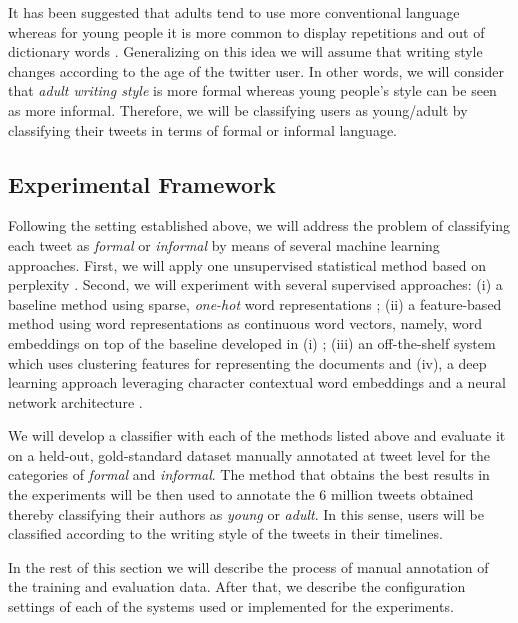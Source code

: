 \documentclass[information,article,submit,moreauthors,pdftex,10pt,a4paper]{Definitions/mdpi}
\begin{document}
It has been suggested that adults tend to use more conventional language \cite{nguyen2013old} whereas for young people it is more common to display repetitions and out of dictionary words \citep{rao2010classifying,rosenthal2011age,morgan2017predicting}. Generalizing on this idea we will assume that writing style changes according to the age of the twitter user. In other words, we will consider that \emph{adult writing style} is more formal whereas young people's style can be seen as more informal. Therefore, we will be classifying users as young/adult by classifying their tweets in terms of formal or informal language.

\subsection{Experimental Framework}\label{sec:exper-fram}

Following the setting established above, we will address the problem of classifying each tweet as \emph{formal} or \emph{informal} by means of several machine learning approaches. First, we will apply one unsupervised statistical method based on perplexity \cite{gamallo2017language}. Second, we will experiment with several supervised approaches: (i) a baseline method using sparse, \emph{one-hot} word representations \cite{pedregosa2011scikit}; (ii) a feature-based method using word representations as continuous word vectors, namely, word embeddings  on top of the baseline developed in (i) \cite{mikolov2013distributed,pennington-etal-2014-glove,mikolov-etal-2018-advances}; (iii) an off-the-shelf system which uses clustering features for representing the documents \cite{agerri2016robust,agerri2019language} and (iv), a deep learning approach leveraging character contextual word embeddings and a neural network architecture \cite{akbik2018contextual}.

We will develop a classifier with each of the methods listed above and evaluate it on a held-out, gold-standard dataset manually annotated at tweet level for the categories of \emph{formal} and \emph{informal}. The method that obtains the best results in the experiments will be then used to annotate the 6 million tweets obtained thereby classifying their authors as \emph{young} or \emph{adult}. In this sense, users will be classified according to the writing style of the tweets in their timelines.

In the rest of this section we will describe the process of manual annotation of the training and evaluation data. After that, we describe the configuration settings of each of the systems used or implemented for the experiments.
\end{document}
